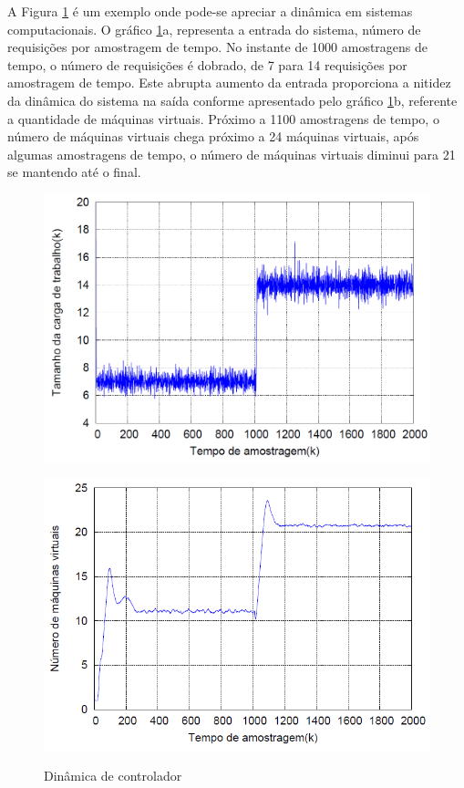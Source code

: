 A Figura \ref{fig:helder} é um exemplo onde pode-se apreciar a dinâmica em sistemas computacionais. O gráfico \ref{fig:helder}a, representa a entrada do sistema, número de requisições por amostragem de tempo. No instante de 1000 amostragens de tempo, o número de requisições é dobrado, de 7 para 14 requisições por amostragem de tempo. Este abrupta aumento da entrada proporciona a nitidez da dinâmica do sistema na saída conforme apresentado pelo gráfico \ref{fig:helder}b, referente a quantidade de máquinas virtuais. Próximo a 1100 amostragens de tempo, o número de máquinas virtuais chega próximo a 24 máquinas virtuais, após algumas amostragens de tempo, o número de máquinas virtuais diminui para 21 se mantendo até o final.

\begin{figure}
	\centering
	\begin{minipage}{.45\textwidth}
		\centering
		\includegraphics[scale=0.2]{images/entrada_resultado_helder_sys_segunda_orderm.png}	
		\label{fig:helder-a}
	\end{minipage}
	\begin{minipage}{.45\textwidth}
		\centering
		\includegraphics[scale=0.29]{images/resultado_helder_sys_segunda_orderm.png}	
		\label{fig:helder-b}
	\end{minipage}
	\caption{Dinâmica de controlador \cite{helder2014}}
	\label{fig:helder}
\end{figure}


